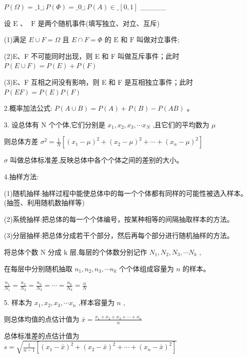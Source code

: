 \documentclass[10pt]{article}
\begin{document}
\(P\left( \Omega \right)  = \_ 1\_ ;P\left( \Phi \right)  = \_ 0\_ ;P\left( A\right)  \in  \_ \left\lbrack  {0,1}\right\rbrack\) \_\_\_\_\_

设 \(\mathrm{E}\text{ 、 }\mathrm{\;F}\) 是两个随机事件(填写独立、对立、互斥)

(1)满足 \(E \cup  F = \Omega\) 且 \(E \cap  F = \Phi\) 的 \(\mathrm{E}\) 和 \(\mathrm{F}\) 叫做对立事件;

(2)E、F 不可能同时出现，则 E 和 F 叫做互斥事件；此时 \(P\left( {E \cup  F}\right)  = P\left( E\right)  + P\left( F\right)\)

(3)E、F 互相之间没有影响，则 E 和 F 是互相独立事件；此时 \(P\left( {EF}\right)  = P\left( E\right) P\left( F\right)\)

2.概率加法公式: \(P\left( {A \cup  B}\right)  = P\left( A\right)  + P\left( B\right)  - P\left( {AB}\right)\) 。

3. 设总体有 \(\mathrm{N}\) 个个体,它们分别是 \({x}_{1},{x}_{2},{x}_{3},\cdots {x}_{N}\) ,且它们的平均数为 \(\mu\)

则总体方差 \({\sigma }^{2} = \frac{1}{N}\left\lbrack  {{\left( {x}_{1} - \mu \right) }^{2} + {\left( {x}_{2} - \mu \right) }^{2} + \cdots  + {\left( {x}_{n} - \mu \right) }^{2}}\right\rbrack\)

\(\sigma\) 叫做总体标准差,反映总体中各个个体之间的差别的大小。

4.抽样方法:

(1)随机抽样:抽样过程中能使总体中的每一个个体都有同样的可能性被选入样本。(抽签、利用随机数抽样等)

(2)系统抽样:把总体的每一个个体编号，按某种相等的间隔抽取样本的方法。

(3)分层抽样:把总体分成若干个部分，然后再每个部分进行随机抽样的方法。

将总体个数 \(\mathrm{N}\) 分成 \(\mathrm{k}\) 层,每层的个体数分别记作 \({N}_{1},{N}_{2},{N}_{3},\cdots {N}_{k}\) ,

在每层中分别随机抽取 \({n}_{1},{n}_{2},{n}_{3},\cdots {n}_{k}\) 个个体组成容量为 \(n\) 的样本。

\(\frac{{n}_{1}}{{N}_{1}} = \frac{{n}_{2}}{{N}_{2}} = \frac{{n}_{3}}{{N}_{3}} = \cdots  = \frac{{n}_{k}}{{N}_{k}} = \frac{n}{N}\)

5. 样本为 \({x}_{1},{x}_{2},{x}_{3},\cdots {x}_{n}\) ,样本容量为 \(n\) ,

则总体均值的点估计值为 \(\bar{x} = \frac{{x}_{1} + {x}_{2} + {x}_{3} + \cdots  + {x}_{n}}{n}\)

总体标准差的点估计值为 \(s = \sqrt{\frac{1}{n - 1}\left\lbrack  {{\left( {x}_{1} - \bar{x}\right) }^{2} + {\left( {x}_{2} - \bar{x}\right) }^{2} + \cdots  + {\left( {x}_{n} - \bar{x}\right) }^{2}}\right\rbrack  }\)
\end{document}
